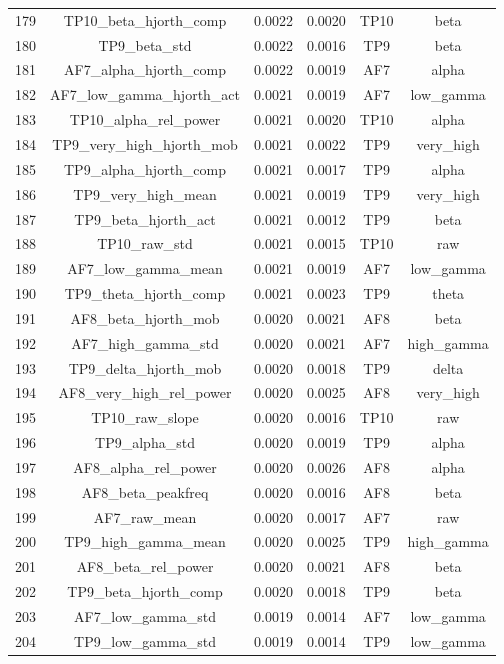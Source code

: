 \begin{table}[hptb]
\begin{table}
\begin{tabular}{cccccc}
179 & TP10_beta_hjorth_comp & 0.0022 & 0.0020 & TP10 & beta \\
180 & TP9_beta_std & 0.0022 & 0.0016 & TP9 & beta \\
181 & AF7_alpha_hjorth_comp & 0.0022 & 0.0019 & AF7 & alpha \\
182 & AF7_low_gamma_hjorth_act & 0.0021 & 0.0019 & AF7 & low_gamma \\
183 & TP10_alpha_rel_power & 0.0021 & 0.0020 & TP10 & alpha \\
184 & TP9_very_high_hjorth_mob & 0.0021 & 0.0022 & TP9 & very_high \\
185 & TP9_alpha_hjorth_comp & 0.0021 & 0.0017 & TP9 & alpha \\
186 & TP9_very_high_mean & 0.0021 & 0.0019 & TP9 & very_high \\
187 & TP9_beta_hjorth_act & 0.0021 & 0.0012 & TP9 & beta \\
188 & TP10_raw_std & 0.0021 & 0.0015 & TP10 & raw \\
189 & AF7_low_gamma_mean & 0.0021 & 0.0019 & AF7 & low_gamma \\
190 & TP9_theta_hjorth_comp & 0.0021 & 0.0023 & TP9 & theta \\
191 & AF8_beta_hjorth_mob & 0.0020 & 0.0021 & AF8 & beta \\
192 & AF7_high_gamma_std & 0.0020 & 0.0021 & AF7 & high_gamma \\
193 & TP9_delta_hjorth_mob & 0.0020 & 0.0018 & TP9 & delta \\
194 & AF8_very_high_rel_power & 0.0020 & 0.0025 & AF8 & very_high \\
195 & TP10_raw_slope & 0.0020 & 0.0016 & TP10 & raw \\
196 & TP9_alpha_std & 0.0020 & 0.0019 & TP9 & alpha \\
197 & AF8_alpha_rel_power & 0.0020 & 0.0026 & AF8 & alpha \\
198 & AF8_beta_peakfreq & 0.0020 & 0.0016 & AF8 & beta \\
199 & AF7_raw_mean & 0.0020 & 0.0017 & AF7 & raw \\
200 & TP9_high_gamma_mean & 0.0020 & 0.0025 & TP9 & high_gamma \\
201 & AF8_beta_rel_power & 0.0020 & 0.0021 & AF8 & beta \\
202 & TP9_beta_hjorth_comp & 0.0020 & 0.0018 & TP9 & beta \\
203 & AF7_low_gamma_std & 0.0019 & 0.0014 & AF7 & low_gamma \\
204 & TP9_low_gamma_std & 0.0019 & 0.0014 & TP9 & low_gamma \\

\end{tabular}
\end{table}
\end{table}
